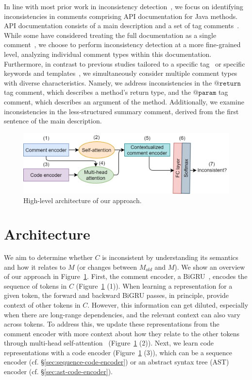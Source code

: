 \documentclass[letterpaper]{article} %
\makeatletter
\newcommand{\CodeIn}[1]{{\ifmmode{\mathtt{#1}}\else$\mathtt{#1}$\fi}}
\newcommand{\Return}{\CodeIn{@return}}
\newcommand{\Param}{\CodeIn{@param}}
\newcommand{\Comment}{$C$}
\newcommand{\OldCode}{$M_{old}$}
\newcommand{\NewCode}{$M$}
\makeatother
\begin{document}
In line with most prior work in inconsistency detection~\cite{Corazza18, icomment2007,tComment,Khamis2010AutomaticQA}, we focus on identifying inconsistencies in comments comprising API documentation for Java methods. API documentation consists of a main description and a set of tag comments~\cite{javadoc}. While some have considered treating the full documentation as a single comment~\cite{Corazza18}, we choose to perform inconsistency detection at a more fine-grained level, analyzing individual comment types within this documentation. Furthermore, in contrast to previous studies tailored to a specific tag~\cite{ZhouParameter, tComment} or specific keywords and templates~\cite{icomment2007,aComment}, we simultaneously consider multiple comment types with diverse characteristics. Namely, we address inconsistencies in the \Return{} tag comment, which describes a method's return type, and the \Param{} tag comment, which describes an argument of the method. Additionally, we examine inconsistencies in the less-structured summary comment, derived from the first sentence of the main description.





\begin{figure}
\centering
\includegraphics[width=\columnwidth]{images/architecture.png}
\caption{High-level architecture of our approach.}
\label{fig:architecture}
\end{figure}

\section{Architecture}
We aim to determine whether \Comment{} is inconsistent by understanding its semantics
and how it relates to \NewCode{} (or changes between \OldCode{} and \NewCode{}). We show an overview of our approach in Figure~\ref{fig:architecture}. First, the comment encoder, a BiGRU~\cite{ChoGRU}, encodes the sequence of tokens in \Comment{} (Figure~\ref{fig:architecture} (1)).
When learning a representation for a given token, the forward and backward BiGRU passes, in principle, provide context of other tokens in \Comment{}. However, this information can get diluted, especially when there are long-range dependencies, and the relevant context can also vary across tokens. To address this, we update these representations from the comment encoder with more context about how they relate to the other tokens through multi-head self-attention~\cite{transformer} (Figure~\ref{fig:architecture} (2)). Next, we learn code representations with a code encoder (Figure~\ref{fig:architecture} (3)), which can be a sequence encoder (cf. \S\ref{sec:sequence-code-encoder}) or an abstract syntax tree (AST) encoder (cf. \S\ref{sec:ast-code-encoder}).
\end{document}
